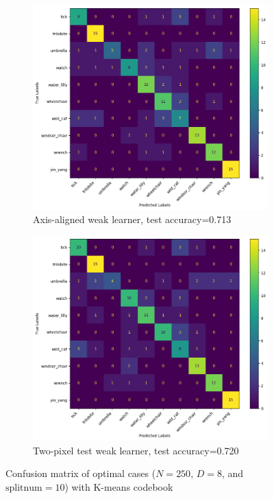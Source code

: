 \begin{figure}[htbp]
	\centering
	\begin{subfigure}[t]{0.4\linewidth}
		\centering
		\includegraphics[width=\linewidth]{image/conf-appendix/km_axis_confusion.png}
		\caption{Axis-aligned weak learner, test accuracy=0.713}
		\label{fig:q2-appfig1}
	\end{subfigure}%
	\quad
	\begin{subfigure}[t]{0.4\linewidth}
		\centering
		\includegraphics[width=\linewidth]{image/conf-appendix/km_twopix_confusion.png}
		\caption{Two-pixel test weak learner, test accuracy=0.720}
		\label{fig:q2-appfig2}
	\end{subfigure}
	\caption{Confusion matrix of optimal cases ($N=250$, $D=8$, and $\text{splitnum}=10$) with K-means codebook}
	\label{fig:APP-q2-fig1}
\end{figure}

